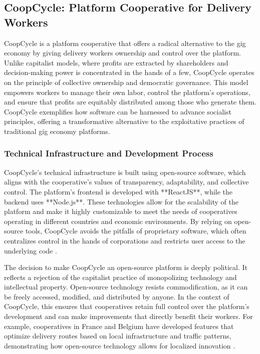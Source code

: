 \begin{refsection}
\subsection{CoopCycle: Platform Cooperative for Delivery Workers}

CoopCycle is a platform cooperative that offers a radical alternative to the gig economy by giving delivery workers ownership and control over the platform. Unlike capitalist models, where profits are extracted by shareholders and decision-making power is concentrated in the hands of a few, CoopCycle operates on the principle of collective ownership and democratic governance. This model empowers workers to manage their own labor, control the platform’s operations, and ensure that profits are equitably distributed among those who generate them. CoopCycle exemplifies how software can be harnessed to advance socialist principles, offering a transformative alternative to the exploitative practices of traditional gig economy platforms.

\subsubsection{Technical Infrastructure and Development Process}

CoopCycle’s technical infrastructure is built using open-source software, which aligns with the cooperative’s values of transparency, adaptability, and collective control. The platform’s frontend is developed with **ReactJS**, while the backend uses **Node.js**. These technologies allow for the scalability of the platform and make it highly customizable to meet the needs of cooperatives operating in different countries and economic environments. By relying on open-source tools, CoopCycle avoids the pitfalls of proprietary software, which often centralizes control in the hands of corporations and restricts user access to the underlying code \cite[pp.~45-60]{smith2009}.

The decision to make CoopCycle an open-source platform is deeply political. It reflects a rejection of the capitalist practice of monopolizing technology and intellectual property. Open-source technology resists commodification, as it can be freely accessed, modified, and distributed by anyone. In the context of CoopCycle, this ensures that cooperatives retain full control over the platform’s development and can make improvements that directly benefit their workers. For example, cooperatives in France and Belgium have developed features that optimize delivery routes based on local infrastructure and traffic patterns, demonstrating how open-source technology allows for localized innovation \cite[pp.~104-118]{scholz2017}.


\end{refsection}
